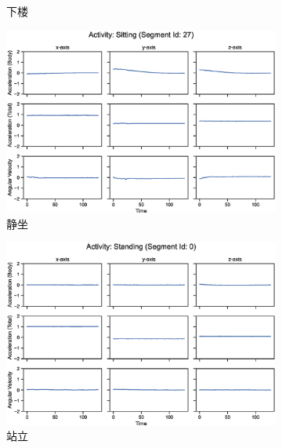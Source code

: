 \documentclass[screen,17pt,cn,founder,mtpro2]{elegantnote}
\begin{document}
\begin{figure}
\begin{subfigure}{.33\textwidth}
        \caption{下楼}
    \end{subfigure}
    \begin{subfigure}{.33\textwidth}
        \centering
        \includegraphics[width=\linewidth]{images/activity-sitting-segment-27.eps}
        \caption{静坐}
    \end{subfigure}
    \begin{subfigure}{.33\textwidth}
        \centering
        \includegraphics[width=\linewidth]{images/activity-standing-segment-0.eps}
        \caption{站立}
    \end{subfigure}
    \begin{subfigure}{.33\textwidth}
        \centering

\end{subfigure}
\end{figure}
\end{document}
